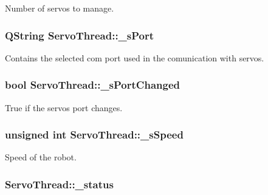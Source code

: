 Number of servos to manage. 

\hypertarget{a00009_ac9a614aa1518efb49b0a06636bd1bdbf}{}
\subsubsection[{\+\_\+s\+Port}]{\setlength{\rightskip}{0pt plus 5cm}Q\+String Servo\+Thread\+::\+\_\+s\+Port\hspace{0.3cm}{\ttfamily [private]}}\label{a00009_ac9a614aa1518efb49b0a06636bd1bdbf}


Contains the selected com port used in the comunication with servos. 

\hypertarget{a00009_a6e803432db01b10ed975132315280fd3}{}
\subsubsection[{\+\_\+s\+Port\+Changed}]{\setlength{\rightskip}{0pt plus 5cm}bool Servo\+Thread\+::\+\_\+s\+Port\+Changed\hspace{0.3cm}{\ttfamily [private]}}\label{a00009_a6e803432db01b10ed975132315280fd3}


True if the servos port changes. 

\hypertarget{a00009_a2591c704c80518be7abb1698364cab5e}{}
\subsubsection[{\+\_\+s\+Speed}]{\setlength{\rightskip}{0pt plus 5cm}unsigned int Servo\+Thread\+::\+\_\+s\+Speed\hspace{0.3cm}{\ttfamily [private]}}\label{a00009_a2591c704c80518be7abb1698364cab5e}


Speed of the robot. 

\hypertarget{a00009_a8d2299f41165bffe1656df776f7f7528}{}
\subsubsection[{\+\_\+status}]{ Servo\+Thread\+::\+\_\+status\hspace{0.3cm}{\ttfamily [private]}}\label{a00009_a8d2299f41165bffe1656df776f7f7528}


